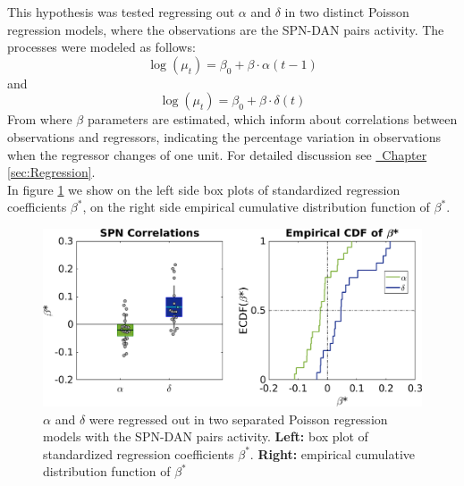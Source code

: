 This hypothesis was tested regressing out $\alpha$ and $\delta$ in two distinct Poisson regression models, where the observations are the SPN-DAN pairs activity. The processes were modeled as follows:
\begin{equation*}
    \log(\mu_t)=\beta_0+\beta\cdot\alpha(t-1)
\end{equation*}
and 
\begin{equation*}
    \log(\mu_t)=\beta_0+\beta\cdot\delta(t)
\end{equation*}
From where $\beta$ parameters are estimated, which inform about correlations between observations and regressors, indicating the percentage variation in observations when the regressor changes of one unit. For detailed discussion see \hyperref[sec:Regression]{~Chapter \ref*{sec:Regression}}.\\
In figure \ref{fig:RL_alphadelta} we show on the left side box plots of standardized regression coefficients $\beta^*$, on the right side empirical cumulative distribution function of $\beta^*$.
\begin{figure}
   \centering
    \includegraphics[scale=0.5]{figures/AlphaAndDeltaPavSPN1.png}
    \caption{$\alpha$ and $\delta$ were regressed out in two separated Poisson regression models with the SPN-DAN pairs activity. \textbf{Left:} box plot of standardized regression coefficients $\beta^*$. \textbf{Right:} empirical cumulative distribution function of $\beta^*$}
    \label{fig:RL_alphadelta}
\end{figure}